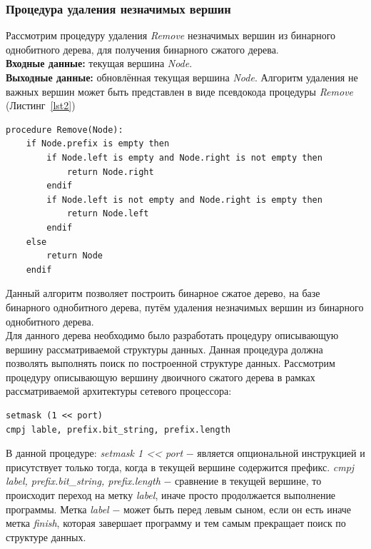 \documentclass[conference]{IEEEtran}
\begin{document}
            \subsubsection{Процедура удаления незначимых вершин}
                Рассмотрим процедуру удаления \emph{Remove} незначимых вершин из бинарного однобитного дерева, для получения бинарного сжатого дерева.\\
                {\bf Входные данные:} текущая вершина \emph{Node}.\\
                {\bf Выходные данные:} обновлённая текущая вершина \emph{Node}.
                Алгоритм удаления не важных вершин может быть представлен в виде псевдокода процедуры \emph{Remove} (Листинг~\ref{lst2})
\\
\begin{center} 
\begin{lstlisting}[caption=Процедура удаления незначимых вершин., label=lst2]
procedure Remove(Node):
    if Node.prefix is empty then
        if Node.left is empty and Node.right is not empty then
            return Node.right
        endif
        if Node.left is not empty and Node.right is empty then
            return Node.left
        endif
    else
        return Node
    endif
\end{lstlisting}
\end{center}
\vspace{1em}
            Данный алгоритм позволяет построить бинарное сжатое дерево, на базе бинарного однобитного дерева, путём удаления незначимых вершин из бинарного однобитного дерева.\\
            Для данного дерева необходимо было разработать процедуру описывающую вершину рассматриваемой структуры данных. Данная процедура должна позволять выполнять
            поиск по построенной структуре данных.
            Рассмотрим процедуру описывающую вершину двоичного сжатого дерева в рамках рассматриваемой архитектуры сетевого процессора:
\\
\begin{lstlisting}[caption=Процедура описывающая вершину бинарном сжатом дереве.]
setmask (1 << port)
cmpj lable, prefix.bit_string, prefix.length
\end{lstlisting}
\vspace{1em}
            В данной процедуре: 
            \emph{setmask 1 << port} $-$ является опциональной инструкцией и присутствует только тогда, когда в текущей вершине содержится префикс.
            \emph{cmpj label, prefix.bit\_string, prefix.length} $-$ сравнение в текущей вершине, то происходит переход на метку \emph{label}, иначе просто продолжается выполнение программы.
            Метка \emph{label} $-$ может быть перед левым сыном, если он есть иначе метка \emph{finish}, 
            которая завершает программу и тем самым прекращает поиск по структуре данных.
\end{document}
